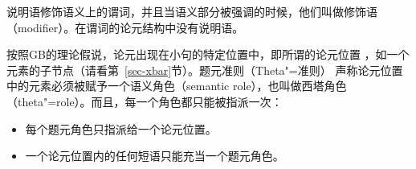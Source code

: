 
说明语修饰语义上的谓词，并且当语义部分被强调的时候，他们叫做修饰语（modifier）。在谓词的论元结构中没有说明语。

按照GB的理论假说，论元出现在小句的特定位置中，即所谓的论元位置 ，如一个\xnull 元素的子节点（请看第~\ref{sec-xbar}节）。题元准则（Theta"=准则） 声称论元位置中的元素必须被赋予一个语义角色（semantic role），也叫做西塔角色（theta"=role）。而且，每一个角色都只能被指派一次\citep[]{Chomsky81a}：
\begin{principle-break}[题元准则]\label{theta-Kriterium}
\begin{itemize}
\item 每个题元角色只指派给一个论元位置。
\item 一个论元位置内的任何短语只能充当一个题元角色。
\end{itemize}
\end{principle-break}
\noindent
%

